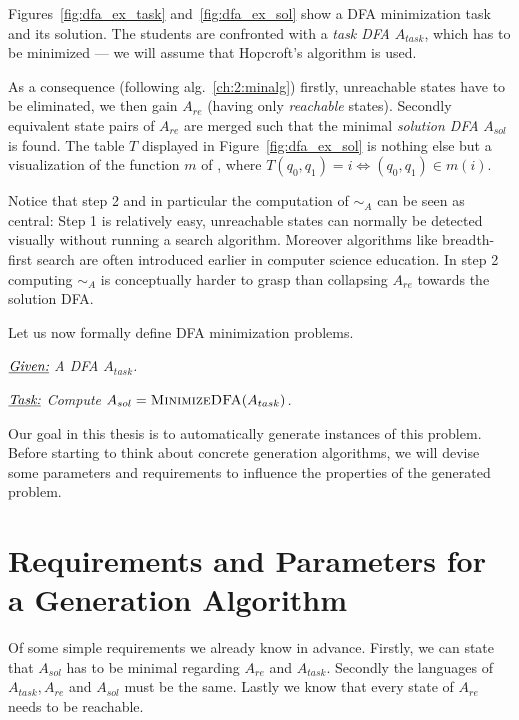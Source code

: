 \noindent Figures~\ref{fig:dfa_ex_task} and~\ref{fig:dfa_ex_sol} show a DFA minimization task and its solution. The students are confronted with a \emph{task DFA} $A_{task}$, which has to be minimized --- we will assume that Hopcroft's algorithm is used.

As a consequence (following alg.~\ref{ch:2:minalg}) firstly, unreachable states have to be eliminated, we then gain $A_{re}$ (having only \emph{reachable} states). Secondly equivalent state pairs of $A_{re}$ are merged such that the minimal \emph{solution DFA} $A_{sol}$ is found. The table $T$ displayed in Figure~\ref{fig:dfa_ex_sol} is nothing else but a visualization of the function $m$ of \mCompDist, where $T(q_0, q_1) = i \Leftrightarrow (q_0, q_1) \in m(i)$.

Notice that step 2 and in particular the computation of $\sim_A$ can be seen as central: Step 1 is relatively easy, unreachable states can normally be detected visually without running a search algorithm. Moreover algorithms like breadth-first search are often introduced earlier in computer science education. In step 2 computing $\sim_A$ is conceptually harder to grasp than collapsing $A_{re}$ towards the solution DFA.

Let us now formally define DFA minimization problems.
\begin{definition}[DFAMinimization] $ $ \\
	$ $ \vspace{-0.4cm} \\
	\noindent $\underline{\emph{Given:}}$ \emph{A DFA $A_{task}$.}
	
	\vspace{0.2cm}
	\noindent $\underline{\emph{Task:}}$ \emph{Compute $A_{sol} = \textsc{MinimizeDFA}(A_{task})$.}
\end{definition}
\noindent Our goal in this thesis is to automatically generate instances of this problem. Before starting to think about concrete generation algorithms, we will devise some parameters and requirements to influence the properties of the generated problem.

\section{Requirements and Parameters for a Generation Algorithm}\label{ch:2:requirements-analysis}

Of some simple requirements we already know in advance. Firstly, we can state that $A_{sol}$ has to be minimal regarding $A_{re}$ and $A_{task}$. Secondly the languages of $A_{task}, A_{re}$ and $A_{sol}$ must be the same. Lastly we know that every state of $A_{re}$ needs to be reachable.

